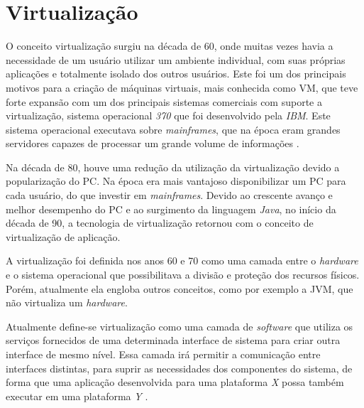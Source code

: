 \chapter{Virtualização}
\label{cap:virtualizacao}

O conceito virtualização surgiu na década de 60, onde muitas vezes havia a necessidade de um usuário utilizar um ambiente individual, 
com suas próprias aplicações e totalmente isolado dos outros usuários. Este foi um dos principais motivos para a criação de máquinas 
virtuais, mais conhecida como \ac{VM}, que teve forte expansão com um dos principais sistemas comerciais com suporte a virtualização, 
sistema operacional \textit{370} que foi desenvolvido pela \textit{IBM}. Este sistema operacional executava sobre \textit{mainframes}, 
que na época eram grandes servidores capazes de processar um grande volume de informações \cite{laureano2008}. 

Na década de 80, houve uma redução da utilização da virtualização devido a popularização do \ac{PC}. Na época era mais vantajoso disponibilizar 
um \ac{PC} para cada usuário, do que investir em \textit{mainframes}. Devido ao crescente avanço e melhor desempenho do \ac{PC} e
ao surgimento da linguagem \textit{Java}, no início da década de 90, a tecnologia de virtualização retornou com o conceito de virtualização
de aplicação.

A virtualização foi definida nos anos 60 e 70 como uma camada entre o \textit{hardware} e o sistema operacional que possibilitava a 
divisão e proteção dos recursos físicos. Porém, atualmente ela engloba outros conceitos, como por exemplo a \ac{JVM}, que não virtualiza
um \textit{hardware}. 

Atualmente define-se virtualização como uma camada de \textit{software} que utiliza os serviços fornecidos de uma determinada interface de 
sistema para criar outra interface de mesmo nível. Essa camada irá permitir a comunicação entre interfaces distintas, para suprir as 
necessidades dos componentes do sistema, de forma que uma aplicação desenvolvida para uma plataforma \textit{X} possa também executar 
em uma plataforma \textit{Y} \cite{laureano2008}.


